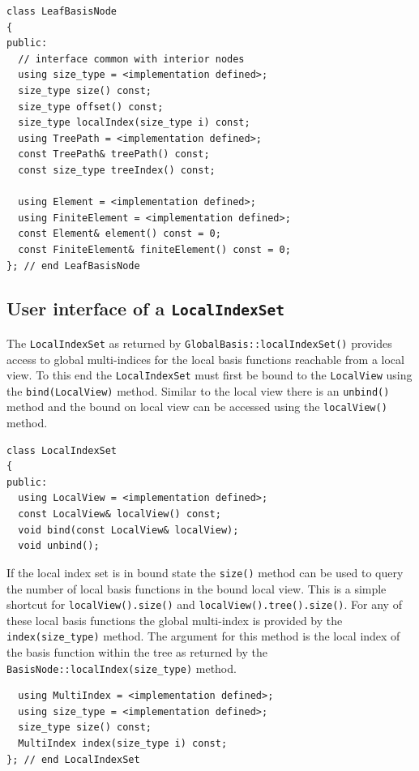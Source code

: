 \documentclass[a4paper,10pt,headings=normal,bibliography=totoc]{scrartcl}
\begin{document}
\begin{lstlisting}
class LeafBasisNode
{
public:
  // interface common with interior nodes
  using size_type = <implementation defined>;
  size_type size() const;
  size_type offset() const;
  size_type localIndex(size_type i) const;
  using TreePath = <implementation defined>;
  const TreePath& treePath() const;
  const size_type treeIndex() const;

  using Element = <implementation defined>;
  using FiniteElement = <implementation defined>;
  const Element& element() const = 0;
  const FiniteElement& finiteElement() const = 0;
}; // end LeafBasisNode
\end{lstlisting}



\subsection{User interface of a \texttt{LocalIndexSet}}
The \texttt{LocalIndexSet} as returned by \texttt{GlobalBasis::localIndexSet()}
provides access to global multi-indices for the
local basis functions reachable from a local view.
To this end the \texttt{LocalIndexSet} must
first be bound to the \texttt{LocalView} using
the \texttt{bind(LocalView)} method. Similar to the
local view there is an \texttt{unbind()} method
and the bound on local view can be accessed
using the \texttt{localView()} method.

\begin{lstlisting}
class LocalIndexSet
{
public:
  using LocalView = <implementation defined>;
  const LocalView& localView() const;
  void bind(const LocalView& localView);
  void unbind();
\end{lstlisting}

If the local index set is in bound state
the \texttt{size()} method can be used to query
the number of local basis functions in the
bound local view. This is a simple shortcut for
\texttt{localView().size()} and \texttt{localView().tree().size()}.
For any of these local basis functions the global
multi-index is provided by the \texttt{index(size\_type)}
method. The argument for this method is the local
index of the basis function within the tree as
returned by the \texttt{BasisNode::localIndex(size\_type)}
method.

\begin{lstlisting}
  using MultiIndex = <implementation defined>;
  using size_type = <implementation defined>;
  size_type size() const;
  MultiIndex index(size_type i) const;
}; // end LocalIndexSet
\end{lstlisting}
\end{document}
